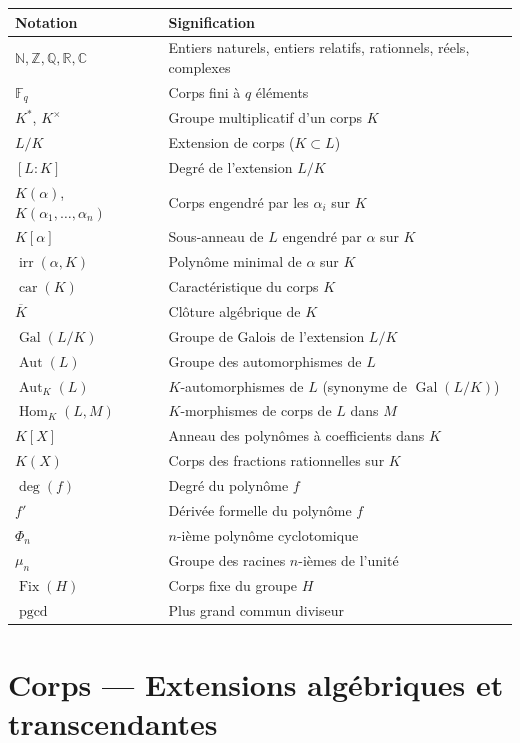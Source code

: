 \documentclass[12pt,a4paper,openany]{book}
\theoremstyle{definition}
\newcommand{\N}{\mathbb{N}}
\newcommand{\Z}{\mathbb{Z}}
\newcommand{\Q}{\mathbb{Q}}
\newcommand{\R}{\mathbb{R}}
\newcommand{\C}{\mathbb{C}}
\newcommand{\F}{\mathbb{F}}
\newcommand{\Gal}{\operatorname{Gal}}
\newcommand{\Aut}{\operatorname{Aut}}
\newcommand{\Hom}{\operatorname{Hom}}
\newcommand{\car}{\operatorname{car}}
\newcommand{\irr}{\operatorname{irr}}
\renewcommand{\deg}{\operatorname{deg}}
\begin{document}
\begin{tabular}{@{}ll@{}}
\toprule
\textbf{Notation} & \textbf{Signification} \\
\midrule
$\N, \Z, \Q, \R, \C$ & Entiers naturels, entiers relatifs, rationnels, réels, complexes \\
$\F_q$ & Corps fini à $q$ éléments \\
$K^*$, $K^\times$ & Groupe multiplicatif d'un corps $K$ \\
$L/K$ & Extension de corps ($K \subset L$) \\
$[L:K]$ & Degré de l'extension $L/K$ \\
$K(\alpha)$, $K(\alpha_1,\dots,\alpha_n)$ & Corps engendré par les $\alpha_i$ sur $K$ \\
$K[\alpha]$ & Sous-anneau de $L$ engendré par $\alpha$ sur $K$ \\
$\irr(\alpha,K)$ & Polynôme minimal de $\alpha$ sur $K$ \\
$\car(K)$ & Caractéristique du corps $K$ \\
$\overline{K}$ & Clôture algébrique de $K$ \\
$\Gal(L/K)$ & Groupe de Galois de l'extension $L/K$ \\
$\Aut(L)$ & Groupe des automorphismes de $L$ \\
$\Aut_K(L)$ & $K$-automorphismes de $L$ (synonyme de $\Gal(L/K)$) \\
$\Hom_K(L,M)$ & $K$-morphismes de corps de $L$ dans $M$ \\
$K[X]$ & Anneau des polynômes à coefficients dans $K$ \\
$K(X)$ & Corps des fractions rationnelles sur $K$ \\
$\deg(f)$ & Degré du polynôme $f$ \\
$f'$ & Dérivée formelle du polynôme $f$ \\
$\Phi_n$ & $n$-ième polynôme cyclotomique \\
$\mu_n$ & Groupe des racines $n$-ièmes de l'unité \\
$\operatorname{Fix}(H)$ & Corps fixe du groupe $H$ \\
$\operatorname{pgcd}$ & Plus grand commun diviseur \\
\bottomrule
\end{tabular}

\chapter{Corps --- Extensions algébriques et transcendantes}
\label{chap:extensions}
\end{document}
